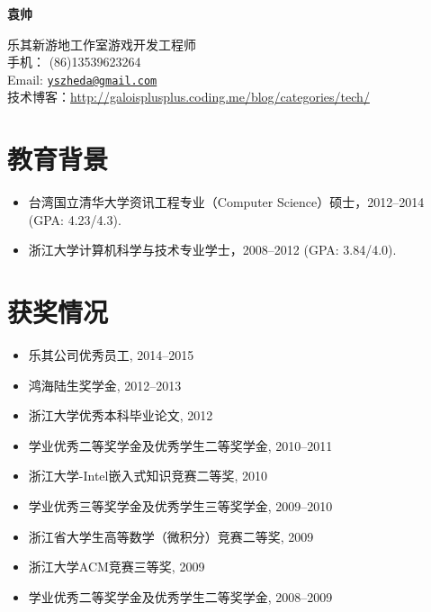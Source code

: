 \documentclass[letterpaper]{article}
\def\name{袁帅}
\begin{document}
\centerline{\huge\bf \name} \vspace{0.25in}
\begin{minipage}[t]{0.8\textwidth}
    乐其新游地工作室游戏开发工程师 \\
    手机： (86)13539623264   \\
    Email: \href{mailto:yszheda@gmail.com}{\tt yszheda@gmail.com} \\
    技术博客：\url{http://galoisplusplus.coding.me/blog/categories/tech/}
\end{minipage}

\section*{教育背景}
\begin{itemize}
    \item 台湾国立清华大学资讯工程专业（Computer Science）硕士，2012--2014 (GPA: 4.23/4.3).
    \item 浙江大学计算机科学与技术专业学士，2008--2012 (GPA: 3.84/4.0).
\end{itemize}

\section*{获奖情况}
\begin{itemize}
    \item 乐其公司优秀员工, 2014--2015
    \item 鸿海陆生奖学金, 2012--2013				
    \item 浙江大学优秀本科毕业论文, 2012
    \item 学业优秀二等奖学金及优秀学生二等奖学金, 2010--2011
    \item 浙江大学-Intel嵌入式知识竞赛二等奖, 2010
    \item 学业优秀三等奖学金及优秀学生三等奖学金, 2009--2010
    \item 浙江省大学生高等数学（微积分）竞赛二等奖, 2009
    \item 浙江大学ACM竞赛三等奖, 2009
    \item 学业优秀二等奖学金及优秀学生二等奖学金, 2008--2009
\end{itemize}
\end{document}
